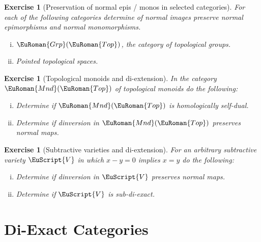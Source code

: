 \documentclass [12pt,oneside]{book}%
\theoremstyle{captionstyle}  %
\newtheorem{exercise}[theorem]{Exercise}
\newenvironment{thmlist}{		%
	\begin{enumerate}[(i)]}{
	\end{enumerate}
}
\newenvironment{exercises}{%
	\def\FrameCommand{{\color{Maroon}\vrule width 0pt}\hspace{0pt}\fboxsep=\FrameSep}%
	\MakeFramed{\hsize=0.95\linewidth\advance\hsize-\width\FrameRestore%
		\bigskip
		\textbf{Exercises}\vspace{-2ex}\footnotesize{
		}}
}
{\endMakeFramed}
\newcommand{\TopMonoids}{\EuRoman{Mnd}(\EuRoman{Top})}			%
\newcommand{\TopGrps}{\EuRoman{Grp}(\EuRoman{Top})}							%
\newcommand{\ZeroObject}{0}                           %
\newcommand{\Ctgry}[1]{\EuScript{#1}}					%
\begin{document}
\begin{exercises}

\begin{exercise}[Preservation of normal epis / monos in selected categories]
    \label{exe:NormalEpi/MonoPreservationSelectedCats}%
    For each of the following categories determine of normal images preserve normal epimorphisms and normal monomorphisms.
    \begin{thmlist}
        \item $\TopGrps$, the category of topological groups.
        \item Pointed topological spaces.
    \end{thmlist}
\end{exercise}


\begin{exercise}[Topological monoids and di-extension]
    \label{exe:TopMon/DiExtension}
    In the category $\TopMonoids$ of topological monoids do the following: %
    \begin{thmlist}
        \item Determine if $\TopMonoids$ is homologically self-dual.
        \item Determine if dinversion in $\TopMonoids$ preserves normal maps.
    \end{thmlist}
\end{exercise}

\begin{exercise}[Subtractive varieties and di-extension]
    \label{exe:SubtractionVarieties-DiExtension}%
    For an arbitrary subtractive variety $\Ctgry{V}$ in which $x-y=\ZeroObject$ implies $x=y$ do the following: %
    \begin{thmlist}
        \item Determine if dinversion in $\Ctgry{V}$ preserves normal maps.
        \item Determine if $\Ctgry{V}$ is sub-di-exact.
    \end{thmlist}
\end{exercise}
\end{exercises}

\bigskip\bigskip

\section{Di-Exact Categories}
\label{sec:DiExactCats}%
\end{document}
